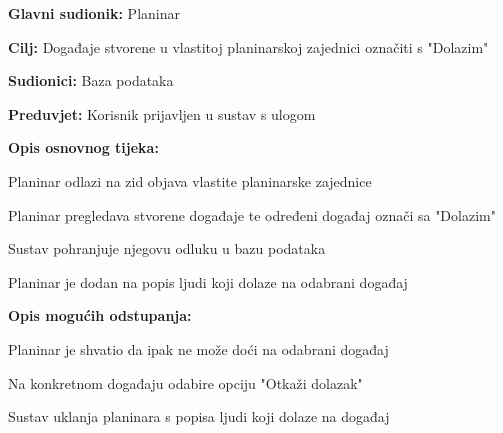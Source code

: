 		\noindent {}
		\begin{packed_item}
			
			\item \textbf{Glavni sudionik: }$ $Planinar$ $
			\item  \textbf{Cilj:} $ $Događaje stvorene u vlastitoj planinarskoj zajednici označiti s "Dolazim"$ $
			\item  \textbf{Sudionici:} $ $Baza podataka$ $
			\item  \textbf{Preduvjet:} $ $Korisnik prijavljen u sustav s ulogom $ $
			\item  \textbf{Opis osnovnog tijeka:}
			
			\item[] \begin{packed_enum}
				
				\item $ $Planinar odlazi na zid objava vlastite planinarske zajednice$ $
				\item $ $Planinar pregledava stvorene događaje te određeni događaj označi sa "Dolazim"$ $
				\item $ $Sustav pohranjuje njegovu odluku u bazu podataka$ $	
				\item $ $Planinar je dodan na popis ljudi koji dolaze na odabrani događaj$ $ 
			\end{packed_enum}
			\item  \textbf{Opis mogućih odstupanja:}
				
			\item[] \begin{packed_item}
				
				\item[3.a] $ $Planinar je shvatio da ipak ne može doći na odabrani događaj$ $
				\item[] \begin{packed_enum}
					\item $ $Na konkretnom događaju odabire opciju "Otkaži dolazak"$ $
					\item $ $Sustav uklanja planinara s popisa ljudi koji dolaze na događaj$ $
				\end{packed_enum}
			\end{packed_item}
		\end{packed_item}
	
